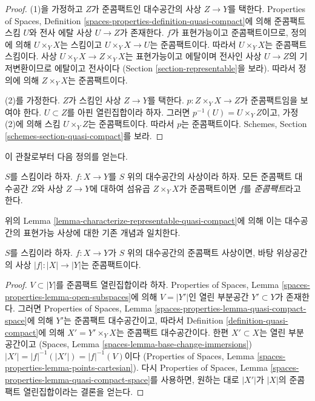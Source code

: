 \begin{proof}
(1)을 가정하고 $Z$가 준콤팩트인 대수공간의 사상 $Z \to Y$를 택한다.
Properties of Spaces, Definition
\ref{spaces-properties-definition-quasi-compact}에 의해 준콤팩트 스킴
$U$와 전사 에탈 사상 $U \to Z$가 존재한다.
$f$가 표현가능이고 준콤팩트이므로, 정의에 의해 $U \times_Y X$는
스킴이고 $U \times_Y X \to U$는 준콤팩트이다.
따라서 $U \times_Y X$는 준콤팩트 스킴이다.
사상 $U \times_Y X \to Z \times_Y X$는 표현가능이고 에탈이며 전사인
사상 $U \to Z$의 기저변환이므로 에탈이고 전사이다
(Section \ref{section-representable}을 보라).
따라서 정의에 의해 $Z \times_Y X$는 준콤팩트이다.

\medskip\noindent
(2)를 가정한다. $Z$가 스킴인 사상 $Z \to Y$를 택한다.
$p : Z \times_Y X \to Z$가 준콤팩트임을 보여야 한다.
$U \subset Z$를 아핀 열린집합이라 하자. 그러면
$p^{-1}(U) = U \times_Y Z$이고, 가정 (2)에 의해 스킴
$U \times_Y Z$는 준콤팩트이다. 따라서 $p$는 준콤팩트이다.
Schemes, Section \ref{schemes-section-quasi-compact}를 보라.
\end{proof}

\noindent
이 관찰로부터 다음 정의를 얻는다.

\begin{definition}
\label{definition-quasi-compact}
$S$를 스킴이라 하자.
$f : X \to Y$를 $S$ 위의 대수공간의 사상이라 하자.
모든 준콤팩트 대수공간 $Z$와 사상 $Z \to Y$에 대하여 섬유곱
$Z \times_Y X$가 준콤팩트이면 $f$를 {\it 준콤팩트}라고 한다.
\end{definition}

\noindent
위의 Lemma \ref{lemma-characterize-representable-quasi-compact}에 의해
이는 대수공간의 표현가능 사상에 대한 기존 개념과 일치한다.

\begin{lemma}
\label{lemma-quasi-compact-is-quasi-compact}
$S$를 스킴이라 하자. $f : X \to Y$가 $S$ 위의 대수공간의 준콤팩트
사상이면, 바탕 위상공간의 사상 $|f| : |X| \to |Y|$는 준콤팩트이다.
\end{lemma}

\begin{proof}
$V \subset |Y|$를 준콤팩트 열린집합이라 하자.
Properties of Spaces, Lemma \ref{spaces-properties-lemma-open-subspaces}에
의해 $V = |Y'|$인 열린 부분공간 $Y' \subset Y$가 존재한다.
그러면 Properties of Spaces, Lemma
\ref{spaces-properties-lemma-quasi-compact-space}에 의해 $Y'$는
준콤팩트 대수공간이고, 따라서 Definition
\ref{definition-quasi-compact}에 의해
$X' = Y' \times_Y X$는 준콤팩트 대수공간이다.
한편 $X' \subset X$는 열린 부분공간이고
(Spaces, Lemma \ref{spaces-lemma-base-change-immersions})
$|X'| = |f|^{-1}(|X'|) = |f|^{-1}(V)$이다
(Properties of Spaces, Lemma
\ref{spaces-properties-lemma-points-cartesian}).
다시 Properties of Spaces, Lemma
\ref{spaces-properties-lemma-quasi-compact-space}를 사용하면,
원하는 대로 $|X'|$가 $|X|$의 준콤팩트 열린집합이라는 결론을 얻는다.
\end{proof}

